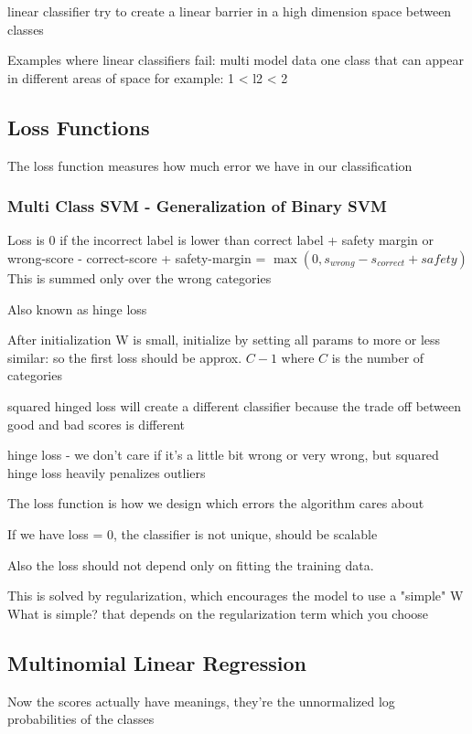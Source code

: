 linear classifier try to create a linear barrier in a high dimension space between classes	

Examples where linear classifiers fail:
multi model data
one class that can appear in different areas of space
for example: 1 < l2 < 2


\subsection{Loss Functions}

The loss function measures how much error we have in our classification

\subsubsection{Multi Class SVM - Generalization of Binary SVM }

Loss is 0 if the incorrect label is lower than correct label + safety margin
or wrong-score - correct-score + safety-margin = $\max(0, s_{wrong} - s_{correct} + safety)$
This is summed only over the wrong categories

Also known as hinge loss

After initialization W is small, initialize by setting all params to more or less similar: 
so the first loss should be approx. $C-1$ where $C$ is the number of categories

squared hinged loss will create a different classifier because the trade off between good and bad scores is different

hinge loss - we don't care if it's a little bit wrong or very wrong, but squared hinge loss heavily penalizes outliers

The loss function is how we design which errors the algorithm cares about

If we have loss = 0, the classifier is not unique, should be scalable 

Also the loss should not depend only on fitting the training data.

This is solved by regularization, which encourages the model to use a "simple" W
What is simple? that depends on the regularization term which you choose

\subsection{Multinomial Linear Regression}

Now the scores actually have meanings, they're the unnormalized log probabilities of the classes

